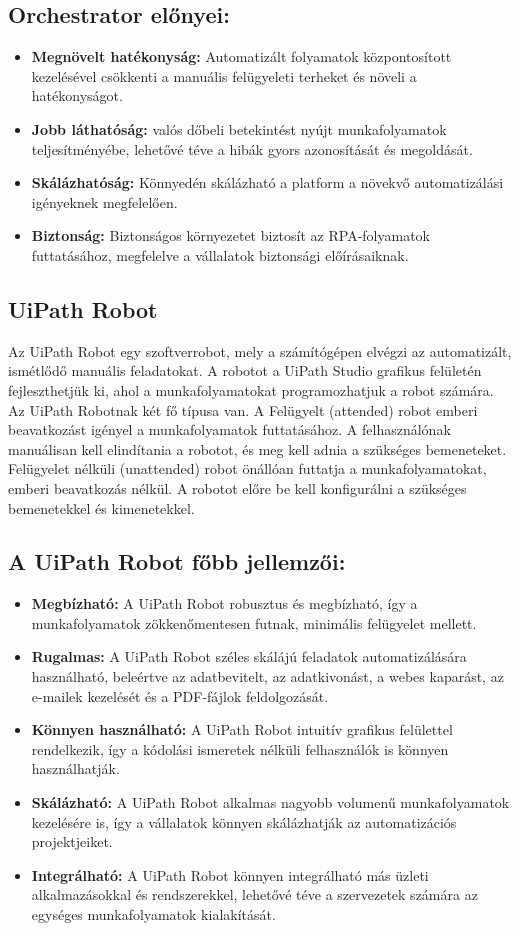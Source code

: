 \documentclass[
]{thesis-ekf}
\theoremstyle{definition}
\theoremstyle{remark}
\begin{document}
\subsection*{Orchestrator előnyei:}
\begin{itemize}
		\item \textbf{Megnövelt hatékonyság:} Automatizált folyamatok központosított kezelésével csökkenti a manuális felügyeleti terheket és növeli a hatékonyságot.
		\item \textbf{Jobb láthatóság:} valós dőbeli betekintést nyújt munkafolyamatok teljesítményébe, lehetővé téve a hibák gyors azonosítását és megoldását.
		\item \textbf{Skálázhatóság:} Könnyedén skálázható a platform a növekvő automatizálási igényeknek megfelelően.
		\item \textbf{Biztonság:}  Biztonságos környezetet biztosít az RPA-folyamatok futtatásához, megfelelve a vállalatok biztonsági előírásaiknak.
\end{itemize}
\subsection{ UiPath Robot \cite{Robot}}
Az UiPath Robot egy szoftverrobot, mely a számítógépen elvégzi az automatizált, ismétlődő manuális feladatokat.  A robotot a UiPath Studio grafikus felületén fejleszthetjük ki, ahol a munkafolyamatokat programozhatjuk a robot számára. Az UiPath Robotnak két fő típusa van. A Felügyelt (attended) robot emberi beavatkozást igényel a munkafolyamatok futtatásához. A felhasználónak manuálisan kell elindítania a robotot, és meg kell adnia a szükséges bemeneteket. Felügyelet nélküli (unattended) robot önállóan futtatja a munkafolyamatokat, emberi beavatkozás nélkül. A robotot előre be kell konfigurálni a szükséges bemenetekkel és kimenetekkel.

\subsection*{A UiPath Robot főbb jellemzői:}
\begin{itemize}
\item\textbf{ Megbízható:} A UiPath Robot robusztus és megbízható, így a munkafolyamatok zökkenőmentesen futnak, minimális felügyelet mellett.
\item\textbf{Rugalmas:} A UiPath Robot széles skálájú feladatok automatizálására használható, beleértve az adatbevitelt, az adatkivonást, a webes kaparást, az e-mailek kezelését és a PDF-fájlok feldolgozását.
\item \textbf{Könnyen használható:} A UiPath Robot intuitív grafikus felülettel rendelkezik, így a kódolási ismeretek nélküli felhasználók is könnyen használhatják.
\item \textbf{Skálázható:} A UiPath Robot alkalmas nagyobb volumenű munkafolyamatok kezelésére is, így a vállalatok könnyen skálázhatják az automatizációs projektjeiket.
\item \textbf{Integrálható:} A UiPath Robot könnyen integrálható más üzleti alkalmazásokkal és rendszerekkel, lehetővé téve a szervezetek számára az egységes munkafolyamatok kialakítását.
\end{itemize}
\end{document}
